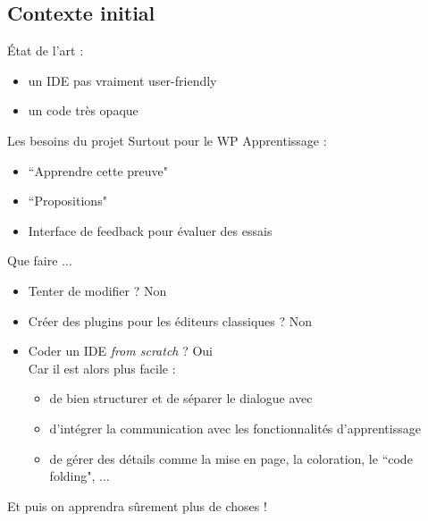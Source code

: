 \newcommand{\qcodeedit}{QCodeEdit}
\newcommand{\qtermwidget}{QTermWidget}
\newcommand{\stdout}{StdOut}
\newcommand{\stderr}{StdErr}

\subsection{Contexte initial}

    \begin{frame}{État de l'art : \coqide{}}

        \begin{itemize}
        	\item un IDE pas vraiment user-friendly
        	\item un code très opaque
	    \end{itemize}
	\end{frame}
		
	\begin{frame}{Les besoins du projet \coquille{}}
        Surtout pour le WP Apprentissage :
	    \begin{itemize}
		    \item ``Apprendre cette preuve"
		    \item ``Propositions"
		    \item Interface de feedback pour évaluer des essais
	    \end{itemize}
	\end{frame}

    \begin{frame}{Que faire $\ldots$}
        \begin{itemize}
        	\item Tenter de modifier \coqide{} ? \pause Non
        	\pause
        	\item Créer des plugins pour les éditeurs classiques ? \pause Non
        	\pause
        	\item Coder un IDE \textit{from scratch} ? \pause Oui\\
        	\pause
        	\pause Car il est alors plus facile :
        	\begin{itemize}
        		\item de bien structurer et de séparer le dialogue avec \coq{}
        		\item d'intégrer la communication avec les fonctionnalités d'apprentissage
        		\item de gérer des détails comme la mise en page, la coloration, le ``code folding", $\ldots$
            \end{itemize}
        \end{itemize}
        \pause
        Et puis on apprendra sûrement plus de choses !
	\end{frame}

